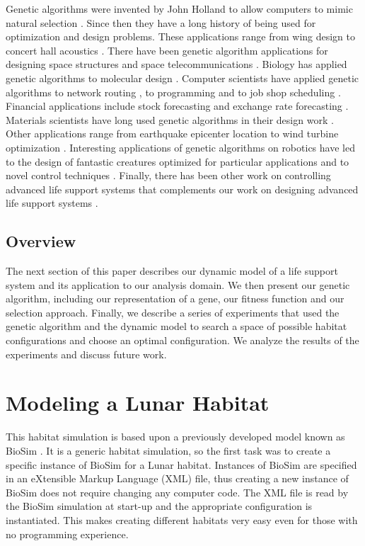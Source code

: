 \documentclass[submit]{aiaa}
\begin{document}
Genetic algorithms were invented by John Holland to allow computers to
mimic natural selection \cite{holland75}.  Since then they have a long
history of being used for optimization and design problems.  These
applications range from wing design
\cite{obayashi_etal00,sasaki_etal01} to concert hall acoustics
\cite{sato_etal02}.  There have been genetic algorithm applications for
designing space structures \cite{keane_brown96} and space
telecommunications \cite{williams_etal01}.  Biology has applied
genetic algorithms to molecular design \cite{glen_payne95}.  Computer
scientists have applied genetic algorithms to network routing
\cite{xu_wu04,he_mort00}, to programming \cite{koza_etal03} and to job
shop scheduling \cite{chryssolouris_subramaniam01}.  Financial
applications include stock forecasting \cite{mahfoud_mani96} and exchange rate
forecasting \cite{andreou_etal02}.  Materials scientists have long
used genetic algorithms in their design work
\cite{weismann_etal98,giro_etal02}.  Other applications range from
earthquake epicenter location \cite{sambridge_gallagher93} to wind turbine
optimization \cite{benini_toffolo02}.  Interesting applications of
genetic algorithms on robotics have led to the design of fantastic
creatures optimized for particular applications
\cite{lipson_pollack00} and to novel control techniques
\cite{nolfi_floreano00}.  Finally, there has been other work on 
controlling advanced life support systems  that
complements our work on designing advanced life support
systems \cite{wu_garibay04}.

\subsection{Overview}

The next section of this paper describes our dynamic model of a life
support system and its application to our analysis domain.  We then
present our genetic algorithm, including our representation of a gene,
our fitness function and our selection approach.  Finally, we describe
a series of experiments that used the genetic algorithm and the
dynamic model to search a space of possible habitat configurations and
choose an optimal configuration.  We analyze the results of the
experiments and discuss future work.

\section{Modeling a Lunar Habitat}

This habitat  simulation is based upon a previously developed  model  known  as BioSim \cite{kortenkamp_bell03}.  
It is a generic habitat simulation, so the first task was to create a
specific instance of BioSim for a Lunar habitat.  
Instances of BioSim are specified in an eXtensible Markup Language (XML) file, thus creating a new instance of BioSim does not require changing any
computer code.  The XML file is read by the BioSim simulation at
start-up and the appropriate configuration is instantiated.  This
makes creating different habitats very easy even for those
with no programming experience.  
\end{document}
